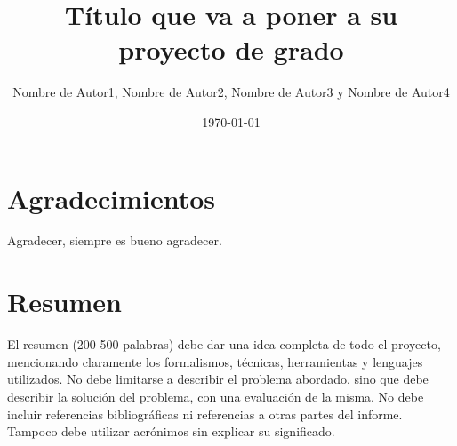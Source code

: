 \documentclass{prgrado}
\title{Título que va a poner a su proyecto de grado}
\author{Nombre de Autor1, Nombre de Autor2, Nombre de Autor3 y Nombre de Autor4}
\date{\today}
\begin{document}

\frontmatter %

\maketitle



\chapter*{Agradecimientos}

Agradecer, siempre es bueno agradecer.




\chapter*{Resumen}

El resumen (200-500 palabras) debe dar una idea completa de todo el
proyecto, mencionando claramente los formalismos, técnicas, herramientas y lenguajes
utilizados. No debe limitarse a describir el problema abordado, sino que debe describir
la solución del problema, con una evaluación de la misma. No debe incluir referencias
bibliográficas ni referencias a otras partes del informe. Tampoco debe utilizar
acrónimos sin explicar su significado.


\hfill \break
{}


\tableofcontents
\newpage



\mainmatter %
\end{document}
